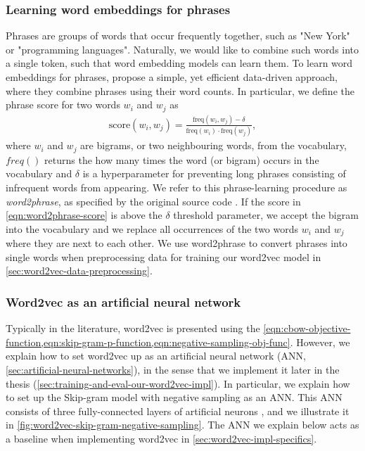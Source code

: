 \subsubsection{Learning word embeddings for phrases}
\label{sec:learning-word-embeddings-for-phrases}
Phrases are groups of words that occur frequently together, such as "New York" or "programming languages". Naturally, we would like to combine such words into a single token, such that word embedding models can learn them. To learn word embeddings for phrases, \cite[4 Learning Phrases]{mikolov2013b} propose a simple, yet efficient data-driven approach, where they combine phrases using their word counts. In particular, we define the phrase score for two words $w_i$ and $w_j$ as
\begin{align}
    \text{score}(w_i, w_j) = \frac{\text{freq}(w_i, w_j) - \delta}{\text{freq}(w_i) \cdot \text{freq}(w_j)},
    \label{eqn:word2phrase-score}
\end{align}
where $w_i$ and $w_j$ are bigrams, or two neighbouring words, from the vocabulary, $freq()$ returns the how many times the word (or bigram) occurs in the vocabulary and $\delta$ is a hyperparameter for preventing long phrases consisting of infrequent words from appearing. We refer to this phrase-learning procedure as \textit{word2phrase}, as specified by the original source code \cites{Word2phraseCCode}. If the score in \cref{eqn:word2phrase-score} is above the $\delta$ threshold parameter, we accept the bigram into the vocabulary and we replace all occurrences of the two words $w_i$ and $w_j$ where they are next to each other. We use word2phrase to convert phrases into single words when preprocessing data for training our word2vec model in \cref{sec:word2vec-data-preprocessing}.

\subsubsection{Word2vec as an artificial neural network}
\label{sec:word2vec-as-an-ann}
Typically in the literature, word2vec is presented using the \cref{eqn:cbow-objective-function,eqn:skip-gram-p-function,eqn:negative-sampling-obj-func}. However, we explain how to set word2vec up as an artificial neural network (ANN, \cref{sec:artificial-neural-networks}), in the sense that we implement it later in the thesis (\cref{sec:training-and-eval-our-word2vec-impl}). In particular, we explain how to set up the Skip-gram model with negative sampling as an ANN. This ANN consists of three fully-connected layers of artificial neurons \cite{rong2016word2vec}, and we illustrate it in \cref{fig:word2vec-skip-gram-negative-sampling}. The ANN we explain below acts as a baseline when implementing word2vec in \cref{sec:word2vec-impl-specifics}.

